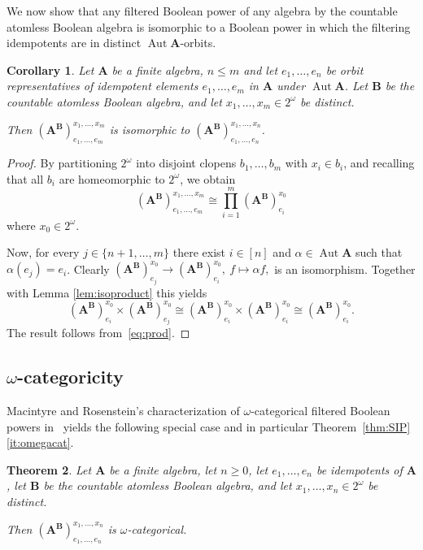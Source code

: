 \documentclass[12pt,a4paper,reqno]{amsart}
\numberwithin{equation}{section}
\theoremstyle{plain}
\newtheorem{thm}{Theorem}[section]
\newtheorem{cor}[thm]{Corollary}
\theoremstyle{definition}
\newcommand{\A}{\mathbf{A}}
\newcommand{\ABxe}{(\mathbf{A^B})^{x_1,\dots,x_n}_{e_1,\dots,e_n}}
\newcommand{\B}{\mathbf{B}}
\DeclareMathOperator{\Aut}{Aut}
\begin{document}
We now show that any filtered Boolean power of any algebra by the countable atomless Boolean algebra is isomorphic to a Boolean power in which the filtering idempotents are in distinct $\Aut \A$-orbits.

\begin{cor} \label{cor:isoreduced}
 Let $\A$ be a finite algebra, $n\leq m$
 and let $e_1,\dots,e_n$ be orbit representatives of
 idempotent elements $e_1,\dots,e_m$ in $\A$ under $\Aut\A$.
 Let $\B$ be the countable atomless Boolean algebra, and let $x_1,\dots,x_m\in 2^\omega$ be distinct.

 Then $(\A^\B)^{x_1,\dots, x_m}_{e_1,\dots,e_m}$ is isomorphic to $\ABxe$.
\end{cor}


\begin{proof}
  By partitioning $2^\omega$ into disjoint clopens $b_1,\dots,b_m$ with $x_i\in b_i$,
  and recalling that all $b_i$ are homeomorphic to $2^\omega$, we obtain
\begin{equation} \label{eq:prod}
(\A^\B)^{x_1,\dots, x_m}_{e_1,\dots,e_m}\cong \prod_{i=1}^m (\A^\B)^{x_0}_{e_i}
\end{equation}
 where $x_0\in 2^\omega$.

Now, for every $j\in \{ n+1,\dots,m\}$ there exist $i\in [n]$ and $\alpha\in\Aut \A$ such that
$\alpha(e_j)=e_i$.
Clearly $(\A^\B)^{x_0}_{e_j}\rightarrow (\A^\B)^{x_0}_{e_i},\ f\mapsto \alpha f,$ is an isomorphism.
Together with Lemma \ref{lem:isoproduct} this yields 
\[
(\A^\B)^{x_0}_{e_i}\times (\A^\B)^{x_0}_{e_j}\cong (\A^\B)^{x_0}_{e_i}\times (\A^\B)^{x_0}_{e_i}\cong
(\A^\B)^{x_0}_{e_i}.
\]
The result follows from~\eqref{eq:prod}.
\end{proof}



\subsection{$\omega$-categoricity} \label{sec:omegacat}



 Macintyre and Rosenstein's characterization of $\omega$-categorical filtered Boolean powers in~\cite{MR:CRN}
 yields the following special case and in particular Theorem~\ref{thm:SIP}\eqref{it:omegacat}.

 \begin{thm}   \label{thm:omegacat}
 Let $\A$ be a finite algebra, let $n \geq 0$, let $e_1 ,\dots , e_n$ be idempotents of $\A$,
 let $\B$ be the countable atomless Boolean algebra, and let $x_1 ,\dots, x_n \in 2^\omega$ be distinct.

 Then $\ABxe$ is $\omega$-categorical. 
\end{thm}
\end{document}
